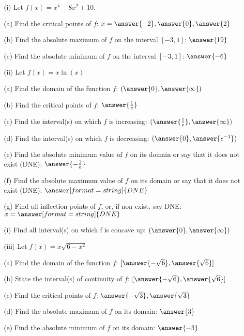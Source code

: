 \documentclass{ximera}
\begin{document}
\begin{exercise}
(i) Let $f(x)=x^4-8x^2+10$. 

(a) Find the critical points of $f$: $x=\answer{-2},\answer{0},\answer{2}$

(b) Find the absolute maximum of $f$ on the interval $[-3,1]$: $\answer{19}$

(c) Find the absolute minimum of $f$ on the interval $[-3,1]$: $\answer{-6}$

(ii) Let $f(x)=x\ln(x)$

(a) Find the domain of the function $f$: $(\answer{0},\answer{\infty})$

(b) Find the critical points of $f$: $\answer{\frac{1}{e}}$

(c) Find the interval(s) on which $f$ is increasing: $(\answer{\frac{1}{e}},\answer{\infty})$

(d) Find the interval(s) on which $f$ is decreasing: $(\answer{0},\answer{e^{-1}})$

(e) Find the absolute minimum value of $f$ on its domain or say that it does not exist (DNE): $\answer{-\frac{1}{e}}$

(f) Find the absolute maximum value of $f$ on its domain or say that it does not exist (DNE): $\answer[format=string]{DNE}$

(g) Find all inflection points of $f$, or, if non exist, say DNE: $x=\answer[format=string]{DNE}$

(i) Find all interval(s) on which f is concave up: $(\answer{0},\answer{\infty})$

(iii) Let $f(x)=x\sqrt{6-x^2}$

(a) Find the domain of the function $f$: $[\answer{-\sqrt{6}},\answer{\sqrt{6}}]$

(b) State the interval(s) of continuity of $f$: $[\answer{-\sqrt{6}},\answer{\sqrt{6}}]$

(c) Find the critical points of $f$: $\answer{-\sqrt{3}},\answer{\sqrt{3}}$

(d) Find the absolute maximum of $f$ on its domain: $\answer{3}$

(e) Find the absolute minimum of $f$ on its domain: $\answer{-3}$
\end{exercise}
\end{document}
